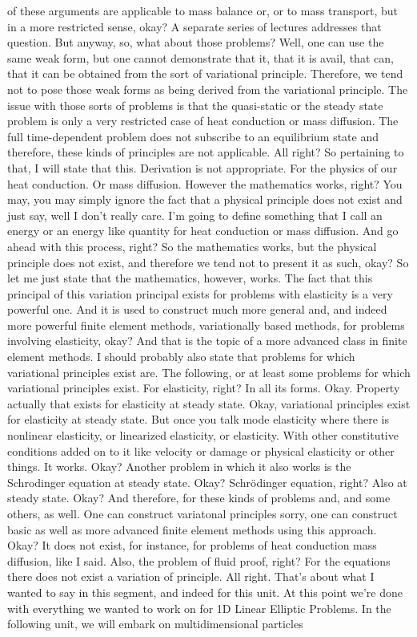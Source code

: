 \documentclass[10pt]{article}
\begin{document}
of these arguments are applicable to mass balance or, or to mass transport, but in a more restricted sense, okay? A separate series of lectures addresses that question. But anyway, so, what about those problems? Well, one can use the same weak form, but one cannot demonstrate that it, that it is avail, that can, that it can be obtained from the sort of variational principle. Therefore, we tend not to pose those weak forms as being derived from the variational principle. The issue with those sorts of problems is that the quasi-static or the steady state problem is only a very restricted case of heat conduction or mass diffusion. The full time-dependent problem does not subscribe to an equilibrium state and therefore, these kinds of principles are not applicable. All right? So pertaining to that, I will state that this. Derivation is not appropriate. For the physics of our heat conduction. Or mass diffusion. However the mathematics works, right? You may, you may simply ignore the fact that a physical principle does not exist and just say, well I don't really care. I'm going to define something that I call an energy or an energy like quantity for heat conduction or mass diffusion. And go ahead with this process, right? So the mathematics works, but the physical principle does not exist, and therefore we tend not to present it as such, okay? So let me just state that the mathematics, however, works. The fact that this principal of this variation principal exists for problems with elasticity is a very powerful one. And it is used to construct much more general and, and indeed more powerful finite element methods, variationally based methods, for problems involving elasticity, okay? And that is the topic of a more advanced class in finite element methods. I should probably also state that problems for which variational principles exist are. The following, or at least some problems for which variational principles exist. For elasticity, right? In all its forms. Okay. Property actually that exists for elasticity at steady state. Okay, variational principles exist for elasticity at steady state. But once you talk mode elasticity where there is nonlinear elasticity, or linearized elasticity, or elasticity. With other constitutive conditions added on to it like velocity or damage or physical elasticity or other things. It works. Okay? Another problem in which it also works is the Schrodinger equation at steady state. Okay? Schrödinger equation, right? Also at steady state. Okay? And therefore, for these kinds of problems and, and some others, as well. One can construct variatonal principles sorry, one can construct basic as well as more advanced finite element methods using this approach. Okay? It does not exist, for instance, for problems of heat conduction mass diffusion, like I said. Also, the problem of fluid proof, right? For the  equations there does not exist a variation of principle. All right. That's about what I wanted to say in this segment, and indeed for this unit. At this point we're done with everything we wanted to work on for 1D Linear Elliptic Problems. In the following unit, we will embark on multidimensional particles
\end{document}
